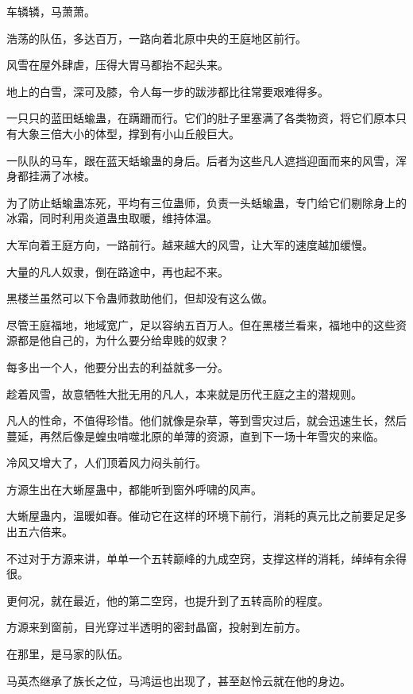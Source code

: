 
\begin{this_body}

车辚辚，马萧萧。

浩荡的队伍，多达百万，一路向着北原中央的王庭地区前行。

风雪在屋外肆虐，压得大胃马都抬不起头来。

地上的白雪，深可及膝，令人每一步的跋涉都比往常要艰难得多。

一只只的蓝田蛞蝓蛊，在蹒跚而行。它们的肚子里塞满了各类物资，将它们原本只有大象三倍大小的体型，撑到有小山丘般巨大。

一队队的马车，跟在蓝天蛞蝓蛊的身后。后者为这些凡人遮挡迎面而来的风雪，浑身都挂满了冰棱。

为了防止蛞蝓蛊冻死，平均有三位蛊师，负责一头蛞蝓蛊，专门给它们剔除身上的冰霜，同时利用炎道蛊虫取暖，维持体温。

大军向着王庭方向，一路前行。越来越大的风雪，让大军的速度越加缓慢。

大量的凡人奴隶，倒在路途中，再也起不来。

黑楼兰虽然可以下令蛊师救助他们，但却没有这么做。

尽管王庭福地，地域宽广，足以容纳五百万人。但在黑楼兰看来，福地中的这些资源都是他自己的，为什么要分给卑贱的奴隶？

每多出一个人，他要分出去的利益就多一分。

趁着风雪，故意牺牲大批无用的凡人，本来就是历代王庭之主的潜规则。

凡人的性命，不值得珍惜。他们就像是杂草，等到雪灾过后，就会迅速生长，然后蔓延，再然后像是蝗虫啃噬北原的单薄的资源，直到下一场十年雪灾的来临。

冷风又增大了，人们顶着风力闷头前行。

方源生出在大蜥屋蛊中，都能听到窗外呼啸的风声。

大蜥屋蛊内，温暖如春。催动它在这样的环境下前行，消耗的真元比之前要足足多出五六倍来。

不过对于方源来讲，单单一个五转巅峰的九成空窍，支撑这样的消耗，绰绰有余得很。

更何况，就在最近，他的第二空窍，也提升到了五转高阶的程度。

方源来到窗前，目光穿过半透明的密封晶窗，投射到左前方。

在那里，是马家的队伍。

马英杰继承了族长之位，马鸿运也出现了，甚至赵怜云就在他的身边。


\end{this_body}
